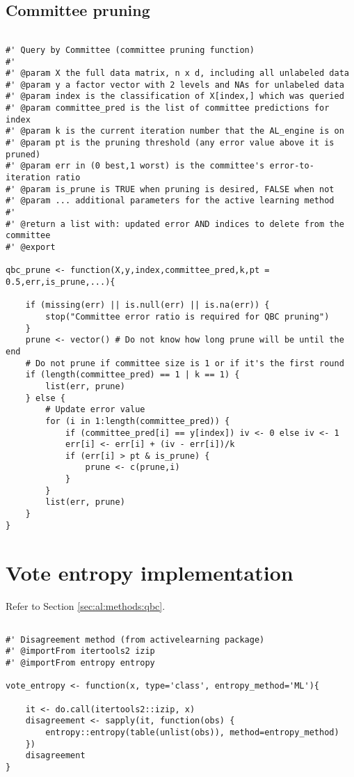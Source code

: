 \subsection{Committee pruning}
{
\begin{lstlisting}

#' Query by Committee (committee pruning function)
#'
#' @param X the full data matrix, n x d, including all unlabeled data
#' @param y a factor vector with 2 levels and NAs for unlabeled data
#' @param index is the classification of X[index,] which was queried
#' @param committee_pred is the list of committee predictions for index
#' @param k is the current iteration number that the AL_engine is on
#' @param pt is the pruning threshold (any error value above it is pruned)
#' @param err in (0 best,1 worst) is the committee's error-to-iteration ratio
#' @param is_prune is TRUE when pruning is desired, FALSE when not
#' @param ... additional parameters for the active learning method
#'
#' @return a list with: updated error AND indices to delete from the committee
#' @export

qbc_prune <- function(X,y,index,committee_pred,k,pt = 0.5,err,is_prune,...){

	if (missing(err) || is.null(err) || is.na(err)) {
		stop("Committee error ratio is required for QBC pruning")
	}
	prune <- vector() # Do not know how long prune will be until the end
	# Do not prune if committee size is 1 or if it's the first round
	if (length(committee_pred) == 1 | k == 1) {
		list(err, prune)
	} else {
		# Update error value
		for (i in 1:length(committee_pred)) {
			if (committee_pred[i] == y[index]) iv <- 0 else iv <- 1
			err[i] <- err[i] + (iv - err[i])/k
			if (err[i] > pt & is_prune) {
				prune <- c(prune,i)
			}
		}
		list(err, prune)
	}
}
\end{lstlisting}
}

\section{Vote entropy implementation}
\label{sec:appendicies:al:entropy}

Refer to Section \ref{sec:al:methods:qbc}.
{
\begin{lstlisting}

#' Disagreement method (from activelearning package)
#' @importFrom itertools2 izip
#' @importFrom entropy entropy

vote_entropy <- function(x, type='class', entropy_method='ML'){

	it <- do.call(itertools2::izip, x)
	disagreement <- sapply(it, function(obs) {
		entropy::entropy(table(unlist(obs)), method=entropy_method)
	})
	disagreement
}
\end{lstlisting}
}



